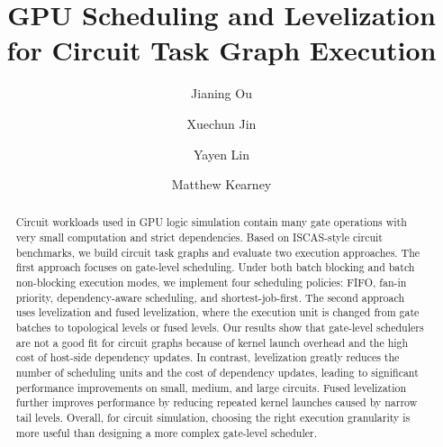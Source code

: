 \documentclass[sigconf,screen,nonacm]{acmart}
\begin{document}
\title{GPU Scheduling and Levelization for Circuit Task Graph Execution}

\author{Jianing Ou}

\author{Xuechun Jin}

\author{Yayen Lin}

\author{Matthew Kearney}

\begin{abstract}

Circuit workloads used in GPU logic simulation contain many gate operations with very small computation and strict dependencies. Based on ISCAS-style circuit benchmarks, we build circuit task graphs and evaluate two execution approaches. The first approach focuses on gate-level scheduling. Under both batch blocking and batch non-blocking execution modes, we implement four scheduling policies: FIFO, fan-in priority, dependency-aware scheduling, and shortest-job-first. The second approach uses levelization and fused levelization, where the execution unit is changed from gate batches to topological levels or fused levels. Our results show that gate-level schedulers are not a good fit for circuit graphs because of kernel launch overhead and the high cost of host-side dependency updates. In contrast, levelization greatly reduces the number of scheduling units and the cost of dependency updates, leading to significant performance improvements on small, medium, and large circuits. Fused levelization further improves performance by reducing repeated kernel launches caused by narrow tail levels. Overall, for circuit simulation, choosing the right execution granularity is more useful than designing a more complex gate-level scheduler.

\end{abstract}

\maketitle
\end{document}

